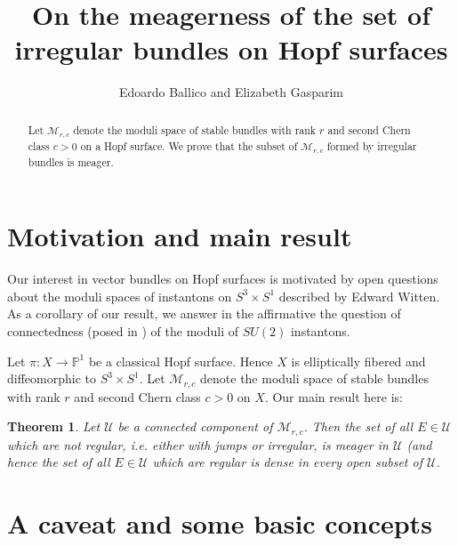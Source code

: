 \documentclass[letterpaper,10pt]{amsart}
\date{}
\theoremstyle{plain}
\newtheorem*{theorem*}{Theorem}
\theoremstyle{definition}
\newcommand{\enm}[1]{\ensuremath{#1}}          %
\newcommand{\cal}[1]{\mathcal{#1}}
\newcommand{\Mm}{\enm{\cal{M}}}
\newcommand{\Uu}{\enm{\cal{U}}}
\renewcommand{\to}[1][]{\xrightarrow{\ #1\ }}
\begin{document}
\date{}
\author{Edoardo Ballico and Elizabeth Gasparim}  
\address{E.B. - Univ. of Trento, Italy; edoardo.ballico@unitn.it;
E.G. - Research Fellow of the Geometry and AI Group,  the Federal Univ. of Technology, Paraná, Brazil; etgasparim@gmail.com}
\title{On the meagerness of the set of irregular bundles on Hopf surfaces} 


\maketitle

\begin{abstract} 
Let $\mathcal M_{r,c}$ denote  the moduli space  of stable bundles
with rank $r$ and second Chern class $c>0$ on 
a Hopf surface.
We prove that the subset of  $\mathcal M_{r,c}$  formed by irregular bundles is meager. \\

\end{abstract}



 
 
 \section*{Motivation and main result}
 
 Our interest in vector bundles on Hopf surfaces  is motivated 
 by open questions about the moduli spaces of instantons on $S^3\times S^1$ 
 described by  Edward Witten. As a corollary of our result, we  answer in the affirmative 
 the question of connectedness (posed in \cite[Sec..4] {W})
  of the moduli of $SU(2)$  instantons.
 
 
Let $\pi\colon X\to \mathbb P^1$ be a classical Hopf surface.
Hence $X$ is elliptically fibered and  diffeomorphic  to $S^3\times S^1$.
 Let $\mathcal M_{r,c}$ denote  the moduli space  of stable bundles
with rank $r$ and second Chern class $c>0$ on $X$. 
Our main result here is:

\begin{theorem*}
Let $\Uu$ be a connected component of $\Mm_{r,c}$. Then the set of all $E\in \Uu$ which are not regular, i.e. either with jumps or irregular, is meager in $\Uu$
(and hence the set of all $E\in \Uu$ which are regular is dense in every open subset of $\Uu$.
\end{theorem*}



 \section*{A caveat and some basic concepts}
\end{document}
